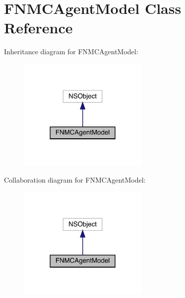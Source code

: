 \hypertarget{interface_f_n_m_c_agent_model}{}\section{F\+N\+M\+C\+Agent\+Model Class Reference}
\label{interface_f_n_m_c_agent_model}


Inheritance diagram for F\+N\+M\+C\+Agent\+Model\+:\nopagebreak
\begin{figure}[H]
\begin{center}
\leavevmode
\includegraphics[width=178pt]{interface_f_n_m_c_agent_model__inherit__graph}
\end{center}
\end{figure}


Collaboration diagram for F\+N\+M\+C\+Agent\+Model\+:\nopagebreak
\begin{figure}[H]
\begin{center}
\leavevmode
\includegraphics[width=178pt]{interface_f_n_m_c_agent_model__coll__graph}
\end{center}
\end{figure}
